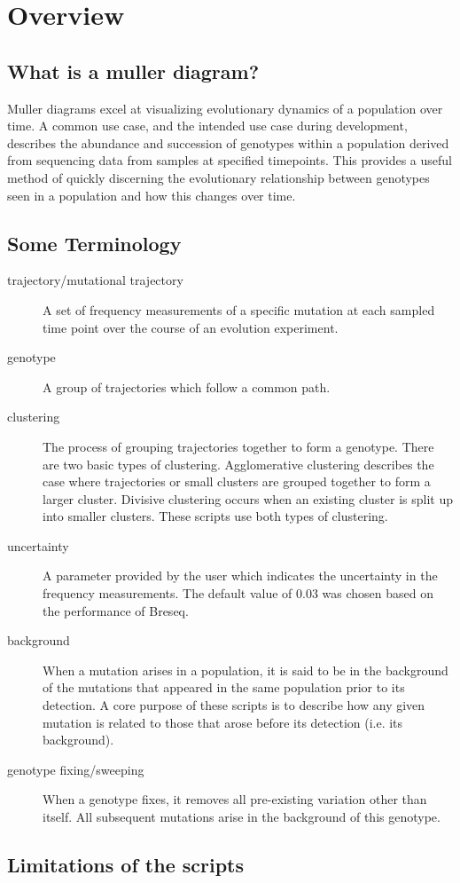 \documentclass{report}
\begin{document}
\chapter{Overview}

\section{What is a muller diagram?}

Muller diagrams excel at visualizing evolutionary dynamics of a population over time. 
A common use case, and the intended use case during development, describes the abundance and succession of genotypes within a population derived from 
sequencing data from samples at specified timepoints. 
This provides a useful method of quickly discerning the evolutionary relationship between genotypes seen in a population and how this changes over time.


\section{Some Terminology}

\begin{description}
\item[trajectory/mutational trajectory] A set of frequency measurements of a specific mutation at each sampled time point over the course of an evolution experiment.

\item[genotype] A group of trajectories which follow a common path.

\item[clustering] The process of grouping trajectories together to form a genotype. 
    There are two basic types of clustering. 
    Agglomerative clustering describes the case where trajectories or small clusters are grouped together to form a larger cluster. 
    Divisive clustering occurs when an existing cluster is split up into smaller clusters. These scripts use both types of clustering.

\item[uncertainty] A parameter provided by the user which indicates the uncertainty in the frequency measurements. 
    The default value of 0.03 was chosen based on the performance of Breseq.

\item[background] When a mutation arises in a population, it is said to be in the background of the mutations that appeared in the same population prior to its detection. 
    A core purpose of these scripts is to describe how any given mutation is related to those that arose before its detection (i.e. its background).

\item[genotype fixing/sweeping] When a genotype fixes, it removes all pre-existing variation other than itself. 
    All subsequent mutations arise in the background of this genotype.

\end{description}

\section{Limitations of the scripts}
\end{document}
